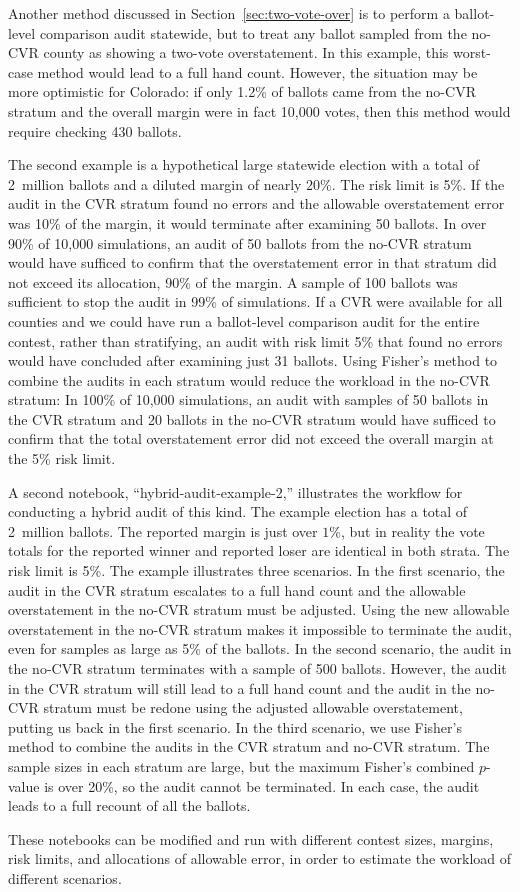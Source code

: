 \documentclass[12pt]{article}
\begin{document}
Another method discussed in Section~\ref{sec:two-vote-over} is to perform a ballot-level comparison audit statewide,
but to treat any ballot sampled from the no-CVR county as showing a two-vote overstatement.
In this example, this worst-case method would lead to a full hand count.
However, the situation may be more optimistic for Colorado:
if only 1.2\% of ballots came from the no-CVR stratum and the overall margin were in fact 10,000 votes,
then this method would require checking 430 ballots.

The second example is a hypothetical large statewide election with a total of 
2~million ballots and a diluted margin of nearly $20\%$.  The risk limit is 5\%.
If the audit in the CVR stratum found no errors and the allowable overstatement error was 10\% of the margin, 
it would terminate after examining 50 ballots.
In over 90\% of 10,000 simulations, an audit of 50 ballots from the no-CVR stratum
would have sufficed to confirm that the overstatement error in that stratum
did not exceed its allocation, 90\% of the margin.
A sample of 100 ballots was sufficient to stop the audit in 99\% of simulations.
If a CVR were available for all counties and we could have run a ballot-level comparison audit for the entire contest, 
rather than stratifying, an audit with risk limit 5\% that found no errors would have concluded after examining just 31 ballots.
Using Fisher's method to combine the audits in each stratum would reduce the workload in the no-CVR stratum:
In 100\% of 10,000 simulations, an audit with samples of 50 ballots in the CVR stratum and 20 ballots in the no-CVR stratum
would have sufficed to confirm that the total overstatement error did not exceed the overall margin at the 5\% risk limit.

A second notebook, ``hybrid-audit-example-2,'' illustrates the workflow for conducting a hybrid audit of this kind.
The example election has a total of 2~million ballots.
The reported margin is just over $1\%$, but in reality the vote totals for the reported winner
and reported loser are identical in both strata.  The risk limit is 5\%.
The example illustrates three scenarios.
In the first scenario, the audit in the CVR stratum escalates to a full hand count and the allowable overstatement
in the no-CVR stratum must be adjusted.
Using the new allowable overstatement in the no-CVR stratum makes it impossible to terminate the audit,
even for samples as large as 5\% of the ballots.
In the second scenario, the audit in the no-CVR stratum terminates with a sample of 500 ballots.
However, the audit in the CVR stratum will still lead to a full hand count and the audit in the no-CVR
stratum must be redone using the adjusted allowable overstatement, putting us back in the first scenario.
In the third scenario, we use Fisher's method to combine the audits in the CVR stratum and no-CVR stratum.
The sample sizes in each stratum are large, but the maximum Fisher's combined $p$-value is over 20\%,
so the audit cannot be terminated.
In each case, the audit leads to a full recount of all the ballots.

These notebooks can be modified and run with different contest sizes, margins, risk limits, and allocations of allowable error, in order to
estimate the workload of different scenarios.


\end{document}
